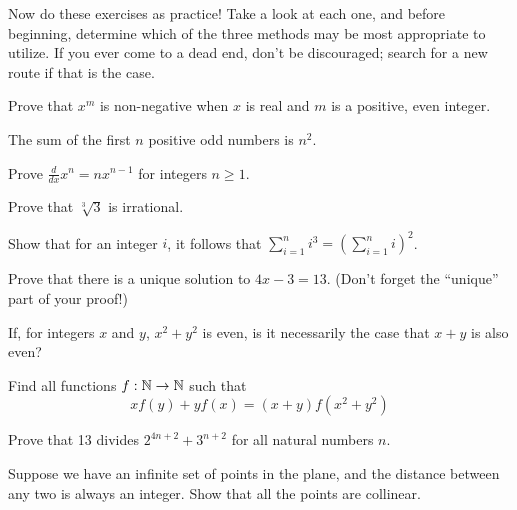 Now do these exercises as practice! Take a look at each one, and before beginning, determine which of the three methods may be most appropriate to utilize. If you ever come to a dead end, don't be discouraged; search for a new route if that is the case.

\begin{exercise}
    Prove that $x^m$ is non-negative when $x$ is real and $m$ is a positive, even integer.
\end{exercise}
\vspace{-5mm}
\begin{exercise}
    The sum of the first $n$ positive odd numbers is $n^2$.
\end{exercise}
\vspace{-5mm}
\begin{exercise}[Calculus]
    Prove $\frac{d}{dx} x^n = nx^{n-1}$ for integers $n\geq 1$.
\end{exercise}
\vspace{-5mm}
\begin{exercise}
    Prove that $\sqrt[3]{3}$ is irrational.
\end{exercise}
\vspace{-5mm}
\begin{exercise}
    Show that for an integer $i$, it follows that $\sum_{i=1}^n i^3 = \left(\sum_{i=1}^n i\right)^2$.
\end{exercise}
\vspace{-5mm}
\begin{exercise}
    Prove that there is a unique solution to $4x-3=13$. (Don't forget the ``unique'' part of your proof!)
\end{exercise}
\vspace{-5mm}
\begin{exercise}
    If, for integers $x$ and $y$, $x^2+y^2$ is even, is it necessarily the case that $x+y$ is also even? 
\end{exercise}
\vspace{-5mm}
\begin{exercise}
    Find all functions $f : \mathbb{N}\to\mathbb{N}$ such that $$xf(y)+yf(x)=(x+y)f(x^2+y^2)$$
\end{exercise}
\vspace{-5mm}
\begin{exercise}
    Prove that 13 divides $2^{4n+2}+3^{n+2}$ for all natural numbers $n$.
\end{exercise}
\vspace{-5mm}
\begin{exercise}
    Suppose we have an infinite set of points in the plane, and the distance between any two is always an integer. Show that all the points are collinear. 
\end{exercise}

